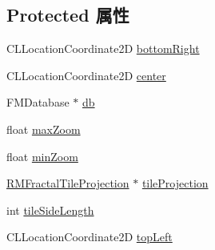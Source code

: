 \subsection*{Protected 属性}
\begin{DoxyCompactItemize}
\item 
C\-L\-Location\-Coordinate2\-D \hyperlink{interface_r_m_d_b_map_source_ab2a40bc56609cd9b73603c54e8f6e0c5}{bottom\-Right}
\item 
C\-L\-Location\-Coordinate2\-D \hyperlink{interface_r_m_d_b_map_source_a507ddd273bc2a994d9d4fe5e4482baf5}{center}
\item 
F\-M\-Database $\ast$ \hyperlink{interface_r_m_d_b_map_source_a7a3b8f8155ec28765c51bc3543e5d630}{db}
\item 
float \hyperlink{interface_r_m_d_b_map_source_ad86d4d2b0eed882420b870bcb842233e}{max\-Zoom}
\item 
float \hyperlink{interface_r_m_d_b_map_source_a7f12d75beb479fbc8b50f2a8cf64a14b}{min\-Zoom}
\item 
\hyperlink{interface_r_m_fractal_tile_projection}{R\-M\-Fractal\-Tile\-Projection} $\ast$ \hyperlink{interface_r_m_d_b_map_source_a98ff222a2a972bf6cf4c317f4d7fa5dc}{tile\-Projection}
\item 
int \hyperlink{interface_r_m_d_b_map_source_a106cd606447ff75d7b81886d2b5a336f}{tile\-Side\-Length}
\item 
C\-L\-Location\-Coordinate2\-D \hyperlink{interface_r_m_d_b_map_source_aa8593714f212eeda83056518c4154606}{top\-Left}
\end{DoxyCompactItemize}


